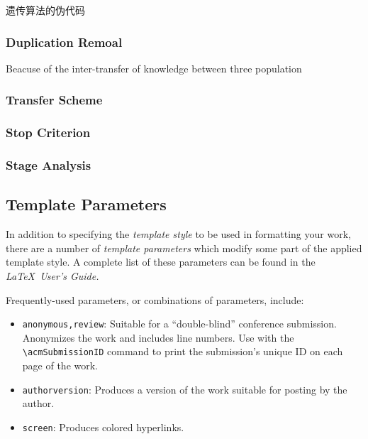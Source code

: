 \documentclass[sigconf]{acmart}
\begin{document}
\begin{algorithm}
  \SetAlgoLined
  \DontPrintSemicolon
  \caption{遗传算法的伪代码}
\end{algorithm}

\subsubsection{Duplication Remoal}
Beacuse of the inter-transfer of knowledge between three population

\subsubsection*{Transfer Scheme}

\subsubsection{Stop Criterion}

\subsubsection{Stage Analysis}





\subsection{Template Parameters}

In addition to specifying the {\itshape template style} to be used in
formatting your work, there are a number of {\itshape template parameters}
which modify some part of the applied template style. A complete list
of these parameters can be found in the {\itshape \LaTeX\ User's Guide.}

Frequently-used parameters, or combinations of parameters, include:
\begin{itemize}
  \item {\verb|anonymous,review|}: Suitable for a ``double-blind''
        conference submission. Anonymizes the work and includes line
        numbers. Use with the \verb|\acmSubmissionID| command to print the
        submission's unique ID on each page of the work.
  \item{\verb|authorversion|}: Produces a version of the work suitable
        for posting by the author.
  \item{\verb|screen|}: Produces colored hyperlinks.
\end{itemize}
\end{document}
